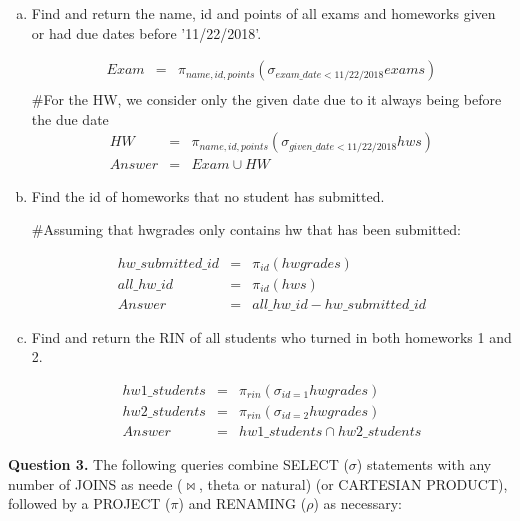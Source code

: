 \documentclass[11pt]{article}
\begin{document}
\begin{enumerate} [(a)]
\item Find and return the name, id and points of all exams and homeworks
  given or had due dates before '11/22/2018'.

\begin{eqnarray*}
Exam & = & \pi_{name,id, points} (\sigma_{exam\_date < 11/22/2018 } exams) \\
\end{eqnarray*}
\#For the HW, we consider only the given date due to it always being before the due date
\begin{eqnarray*}
HW & = & \pi_{name,id, points} (\sigma_{given\_date < 11/22/2018 } hws) \\
Answer & = & Exam \cup HW
\end{eqnarray*}

\item Find the id of homeworks that no student has submitted.

\#Assuming that hwgrades only contains hw that has been submitted:

\begin{eqnarray*}
hw\_submitted\_id & = & \pi_{id} (hwgrades) \\
all\_hw\_id & = & \pi_{id} (hws) \\
Answer & = & all\_hw\_id - hw\_submitted\_id
\end{eqnarray*}

\item Find and return the RIN of all students who turned in both
  homeworks 1 and 2.
  
\begin{eqnarray*}
hw1\_students & = & \pi_{rin} (\sigma_{id=1} hwgrades) \\
hw2\_students & = & \pi_{rin} (\sigma_{id=2} hwgrades) \\
Answer & = & hw1\_students \cap hw2\_students
\end{eqnarray*}

\end{enumerate}
\newpage

{\bf Question 3.} The following queries combine SELECT ($\sigma$)
statements with any number of JOINS as neede ($\bowtie$, theta or
natural) (or CARTESIAN PRODUCT), followed by a PROJECT ($\pi$) and
RENAMING ($\rho$) as necessary:
\end{document}
